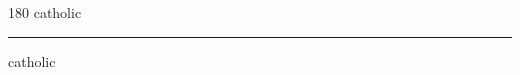 
\begin{frame}
\begin{center}
\begin{turn}{180}
{\fontsize{2.5cm}{1em}\selectfont catholic}
\end{turn}
\vspace{1em}\par  
\hrule
\vspace{1em}\par  
{\fontsize{2.5cm}{1em}\selectfont catholic}
\end{center}
\end{frame}
